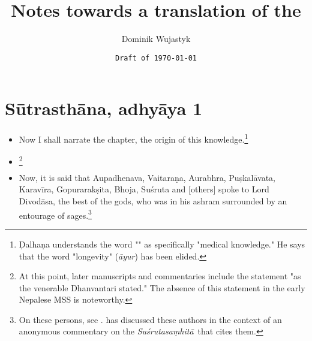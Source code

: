 \documentclass[12pt]{article}
\title{Notes towards a translation of the \SS}
\author{Dominik Wujastyk}
\date{\texttt{Draft of \today }}
\renewcommand{\SS}{\emph{Suśrutasaṃhitā}}
\begin{document}
       
    
    \maketitle
    
    \section{Sūtrasthāna, adhyāya 1}
\begin{itemize}
    \item [1.1]
    Now I shall narrate the chapter, the origin of this knowledge.\footnote{Ḍalhaṇa 
    understands the word "" as specifically "medical knowledge."  
    He says that the word "longevity" (\emph{āyur}) 
     has been elided.}
    
%    
    
    \item[1.2]\footnote{At this point, later manuscripts and commentaries include the 
    statement "as the venerable Dhanvantari stated."  The absence of this statement in the 
    early Nepalese MSS is noteworthy.}
    
    \item[1.3] Now, it is said that Aupadhenava, Vaitaraṇa, Aurabhra, Puṣkalāvata,
Karavīra, Gopurarakṣita, Bhoja, Suśruta and [others] spoke to Lord Divodāsa,
the best of the gods, who was in his ashram surrounded by an entourage of
sages.\footnote{On these persons, see \cite[IA 369\,ff.]{meul-hist}. 
\citet{kleb-2021} has discussed these authors in the context of an anonymous commentary 
on the \SS\ that cites them.}
    
    

\end{itemize}
\end{document}
